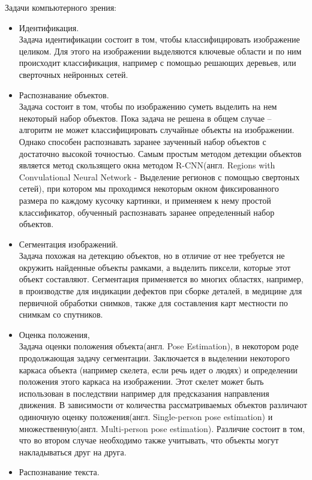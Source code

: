     Задачи компьютерного зрения:
    \begin{itemize}
        \item Идентификация. \\
            Задача идентификации состоит в том, чтобы классифицировать изображение целиком. Для этого на изображении выделяются ключевые области и по ним происходит классификация, например с помощью решающих деревьев, или сверточных нейронных сетей.
        \item Распознавание объектов. \\
            Задача состоит в том, чтобы по изображению суметь выделить на нем некоторый набор объектов. Пока задача не решена в общем случае – алгоритм не может классифицировать случайные объекты на изображении. Однако способен распознавать заранее заученный набор объектов с достаточно высокой точностью. Самым простым методом детекции объектов является метод скользящего окна методом R-CNN(англ. Regions with Convulational Neural Network - Выделение регионов с помощью свертоных сетей), при котором мы проходимся некоторым окном фиксированного размера по каждому кусочку картинки, и применяем к нему простой классификатор, обученный распознавать заранее определенный набор объектов.
        \item Сегментация изображений. \\
            Задача похожая на детекцию объектов, но в отличие от нее требуется не окружить найденные объекты рамками, а выделить пиксели, которые этот объект составляют. Сегментация применяется во многих областях, например, в производстве для индикации дефектов при сборке деталей, в медицине для первичной обработки снимков, также для составления карт местности по снимкам со спутников.
        \item Оценка положения, \\
            Задача оценки положения объекта(англ. Pose Estimation), в некотором роде продолжающая задачу сегментации. Заключается в выделении некоторого каркаса объекта (например скелета, если речь идет о людях) и определении положения этого каркаса на изображении. Этот скелет может быть использован в последствии например для предсказания направления движения. В зависимости от количества рассматриваемых объектов различают одиночную оценку положения(англ. Single-person pose estimation) и множественную(англ. Multi-person pose estimation). Различие состоит в том, что во втором случае необходимо также учитывать, что объекты могут накладываться друг на друга.
        \item Распознавание текста. \\

\end{itemize}
